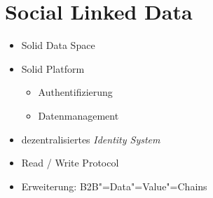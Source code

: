 
\section{Social Linked Data}

\begin{itemize}
    \item Solid Data Space \cite{mecklerWebLinkedData2023}

    \item Solid Platform \cite{sambraSolidPlatformDecentralized2016}
    \begin{itemize}
        \item Authentifizierung
        \item Datenmanagement
    \end{itemize}

    \item dezentralisiertes \emph{Identity System}
    \item Read / Write Protocol
    \item Erweiterung: B2B"=Data"=Value"=Chains \cite{bothSolidBasedB2BData2025}
\end{itemize}
